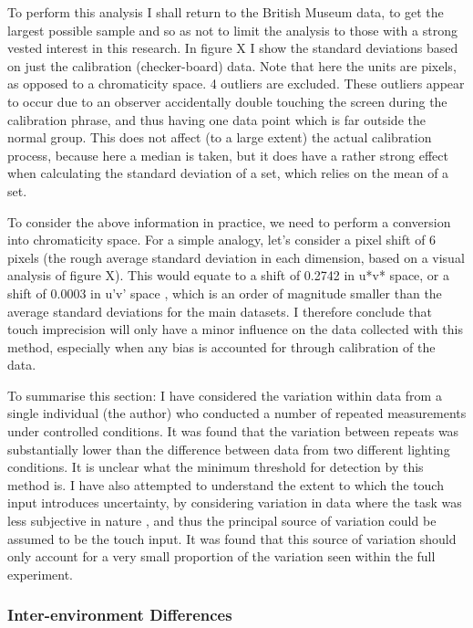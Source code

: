 To perform this analysis I shall return%
to the British Museum data, to get the largest possible sample and so as not to limit the analysis to those with a strong vested interest in this research. In figure X I show the standard deviations based on just the calibration (checker-board) data. Note that here the units are pixels, as opposed to a chromaticity space. 4 outliers are excluded. These outliers appear to occur due to an observer accidentally double touching the screen during the calibration phrase, and thus having one data point which is far outside the normal group. This does not affect (to a large extent) the actual calibration process, because here a median is taken, but it does have a rather strong effect when calculating the standard deviation of a set, which relies on the mean of a set.


To consider the above information in practice, we need to perform a conversion into chromaticity space. For a simple analogy, let's consider a pixel shift of 6 pixels (the rough average standard deviation in each dimension, based on a visual analysis of figure X).
This would equate to a shift of 0.2742 in u*v* space, or a shift of 0.0003 in u'v' space%
, which is an order of magnitude smaller than the average standard deviations for the main datasets. I therefore conclude that touch imprecision will only have a minor influence on the data collected with this method, especially when any bias is accounted for through calibration of the data.

To summarise this section: I have considered the variation within data from a single individual (the author) who conducted a number of repeated measurements under controlled conditions. It was found that the variation between repeats was substantially lower than the difference between data from two different lighting conditions. It is unclear what the minimum threshold for detection by this method is.
I have also attempted to understand the extent to which the touch input introduces uncertainty, by considering variation in data where the task was less subjective in nature , and thus the principal source of variation could be assumed to be the touch input. It was found that this source of variation should only account for a very small proportion of the variation seen within the full experiment.

\subsubsection{Inter-environment Differences}

